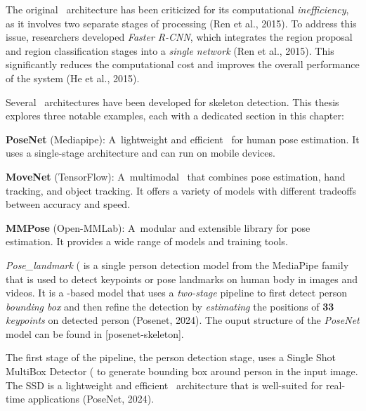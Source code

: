 The original \RCNN\ architecture has been criticized for its computational {\em inefficiency}, as it involves two separate stages of processing (\scc Ren et al., 2015). To address this issue, researchers developed {\em Faster R-CNN}, which integrates the region proposal and region classification stages into a {\em single network} (\scc Ren et al., 2015). This significantly reduces the computational cost and improves the overall performance of the system (\scc He et al., 2015).

Several \NN\ architectures have been developed for skeleton detection. This thesis explores three notable examples, each with a dedicated section in this chapter:

\startitemize[n]
    \item {\bf PoseNet} (Mediapipe): A~lightweight and efficient \NN\ for human pose estimation. It uses a single-stage architecture and can run on mobile devices.
    \item {\bf MoveNet} (TensorFlow): A~multimodal \NN\ that combines pose estimation, hand tracking, and object tracking. It offers a variety of models with different tradeoffs between accuracy and speed.
    \item {\bf MMPose} (Open-MMLab): A~modular and extensible library for pose estimation. It provides a wide range of models and training tools.
\stopitemize

{\em Pose_landmark} (\PoseNet\) is a single person detection model from the MediaPipe family that is used to detect keypoints or pose landmarks on human body in images and videos. It is a \CNN\--based model that uses a {\em two-stage} pipeline to first detect person {\em bounding box} and then refine the detection by {\em estimating} the positions of {\bf 33} {\em keypoints} on detected person (\scc Posenet, 2024). The ouput structure of the {\em PoseNet} model can be found in [posenet-skeleton].

The first stage of the pipeline, the person detection stage, uses a Single Shot MultiBox Detector (\SSD\) to generate bounding box around person in the input image. The SSD is a lightweight and efficient \CNN\ architecture that is well-suited for real-time applications (\scc PoseNet, 2024).


